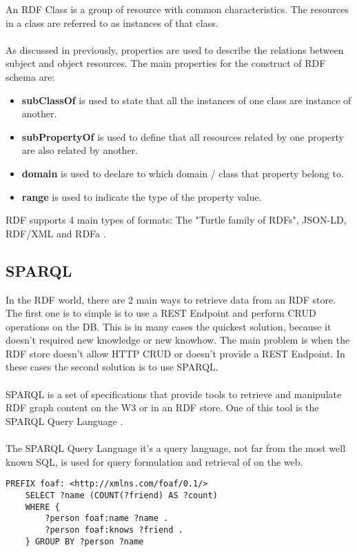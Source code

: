 An RDF Class is a group of resource with common characteristics. The resources in a class are referred to as instances of that class.
\\
\\
As discussed in previously, properties are used to describe the relations between subject and object resources.
The main properties for the construct of RDF schema are: 
\begin{itemize}
	\item \textbf{subClassOf} is used to state that all the instances of one class are instance of another.
	\item \textbf{subPropertyOf} is used to define that all resources related by one property are also related by another.
	\item \textbf{domain} is used to declare to which domain / class that property belong to.
	\item \textbf{range} is used to indicate the type of the property value.
\end{itemize}

RDF supports 4 main types of formats: The "Turtle family of RDFs", JSON-LD, RDF/XML and RDFa \cite{rdf}.



\subsection{SPARQL \label{sec:bbb}}
In the RDF world, there are 2 main ways to retrieve data from an RDF store. The first one is to simple is to use a REST Endpoint and perform CRUD operations on the DB. This is in many cases the quickest solution, because it doesn't required new knowledge or new knowhow. 
The main problem is when the RDF store doesn't allow HTTP CRUD or doesn't provide a REST Endpoint.
In these cases the second solution is to use SPARQL.
\\
\\
SPARQL is a set of specifications that provide tools to retrieve and manipulate RDF graph content on the W3 or in an RDF store.
One of this tool is the SPARQL Query Language \cite{sparql}.
\\
\\
The SPARQL Query Language it's a query language, not far from the most well known SQL, is used for query formulation and retrieval of on the web.
\begin{lstlisting}[language=SPARQL, caption={Example of SPARQL Query}, basicstyle=\ttfamily, frame=single]
    PREFIX foaf: <http://xmlns.com/foaf/0.1/>
    SELECT ?name (COUNT(?friend) AS ?count)
    WHERE { 
        ?person foaf:name ?name . 
        ?person foaf:knows ?friend . 
    } GROUP BY ?person ?name
\end{lstlisting}

